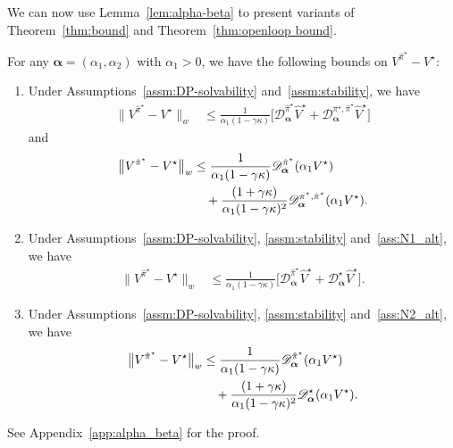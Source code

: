 \documentclass[letterpaper, 10pt]{IEEEtran}
\newcommand*\MISMATCH{\mathscr{D}}
\newcommand*\scale{(\alpha_1,\alpha_2)}
\begin{document}
We can now use Lemma~\ref{lem:alpha-beta} to present variants of  Theorem~\ref{thm:bound} and Theorem~\ref{thm:openloop bound}.

\begin{theorem}\label{thm:alpha_beta}
    For any $\boldsymbol{\alpha} = \scale$ with $\alpha_1 > 0$, we have the following bounds on $V^{\hat \pi^\star} - V^\star$:
   \begin{enumerate}
   \item Under Assumptions~\ref{assm:DP-solvability} and~\ref{assm:stability}, we have
          \begin{align*}
          \bigl\| V^{\hat \pi^\star} - V^\star \bigr\|_w
          &\leq
          \frac{1}{\alpha_1(1 - \gamma \kappa) }
          \bigl[ \MISMATCH_{\boldsymbol{\alpha}}^{\hat \pi^\star} \hat V^\star
          + \MISMATCH_{\boldsymbol{\alpha}}^{\pi^\star, \hat \pi^\star} \hat V^\star \bigr]
       \end{align*}
       and
    \begin{align*}
      \bigl\| V^{\hat \pi^\star} - V^\star \bigr\|_w
      &\le
      \frac{1}{\alpha_1(1 - \gamma \kappa) }
      \MISMATCH_{\boldsymbol{\alpha}}^{\hat \pi^\star} (\alpha_1 V^\star) \notag \\
      &\quad +
      \frac{(1 + \gamma \kappa)}{\alpha_1(1 - \gamma \kappa)^2 }
      \MISMATCH_{\boldsymbol{\alpha}}^{\pi^\star, \hat \pi^\star}(\alpha_1 V^\star). 
   \end{align*}
    \item Under Assumptions~\ref{assm:DP-solvability}, \ref{assm:stability} and~\ref{ass:N1_alt}, we have
      \begin{align*}
          \bigl\| V^{\hat \pi^\star} - V^\star \bigr\|_w
          &\le 
          \frac{ 1  }
         {\alpha_1 (1 - \gamma \kappa) }
          \bigl[ \MISMATCH^{\hat \pi^\star}_{\boldsymbol{\alpha}} \hat V^\star
          + \MISMATCH^{\star}_{\boldsymbol{\alpha}} \hat V^\star \bigr].
       \end{align*}
       \item Under Assumptions~\ref{assm:DP-solvability}, \ref{assm:stability} and~\ref{ass:N2_alt}, we have
    \begin{align*}
        \bigl\| V^{\hat \pi^\star} - V^\star \bigr\|_w
          &\le
          \frac{1}{\alpha_1(1 - \gamma \kappa) }
          \MISMATCH^{\hat \pi^\star}_{\boldsymbol{\alpha}} (\alpha_1 V^\star)
          \notag \\
          &\quad +
          \frac{(1 + \gamma \kappa)}{\alpha_1(1 - \gamma \kappa)^2 }
          \MISMATCH^{\star}_{\boldsymbol{\alpha}} (\alpha_1 V^\star). 
    \end{align*}
   \end{enumerate}
   \end{theorem}
See Appendix~\ref{app:alpha_beta} for the proof.
\end{document}
